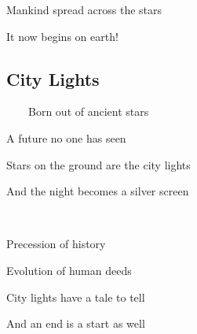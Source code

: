 \documentclass[11pt]{article}
\begin{document}
	Mankind spread across the stars
	
	It now begins on earth!
	\newpage
	
	\subsection{City Lights}
	
	\ \ \ \ Born out of ancient stars
	
	A future no one has seen
	
	Stars on the ground are the city lights
	
	And the night becomes a silver screen
	
	\ 
	
	Precession of history
	
	Evolution of human deeds
	
	City lights have a tale to tell
	
	And an end is a start as well

	
\end{document}
